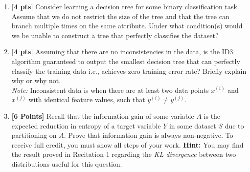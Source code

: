 \begin{enumerate}
\begin{enumerate}[label=(\roman*)]
    
\end{enumerate}

\item \textbf{[4 pts]} Consider learning a decision tree for some binary classification task. Assume that we do not restrict the size of the tree and that the tree can branch multiple times on the same attribute. Under what condition(s) would we be unable to construct a tree that perfectly classifies the dataset?  
\begin{tcolorbox}[fit,height=5cm, width=15cm, blank, borderline={1pt}{-2pt}]
\end{tcolorbox}


\item \textbf{[4 pts]} Assuming that there are no inconsistencies in the data, is the ID3 algorithm guaranteed to output the smallest decision tree that can perfectly classify the training data i.e., achieves zero training error rate? Briefly explain why or why not. \\
\textit{Note:} Inconsistent data is when there are at least two data points $x^{(i)}$ and $x^{(j)}$ with identical feature values, such that $y^{(i)} \neq y^{(j)}$.
\begin{tcolorbox}[fit,height=5cm, width=15cm, blank, borderline={1pt}{-2pt}]
\end{tcolorbox}


\newpage
\item {\bf [6 Points]} Recall that the information gain of some variable $A$ is the expected reduction in entropy of a target variable $Y$ in some dataset $S$ due to partitioning on $A$. Prove that information gain is always non-negative. To receive full credit, you must show all steps of your work. \textbf{Hint: }You may find the result proved in Recitation 1 regarding the \emph{KL divergence} between two distributions useful for this question.

        \begin{tcolorbox}[fit,height=19cm, width=0.95\textwidth, blank, borderline={1pt}{-2pt}]
  

        \end{tcolorbox}

\end{enumerate}
\newpage

\newpage